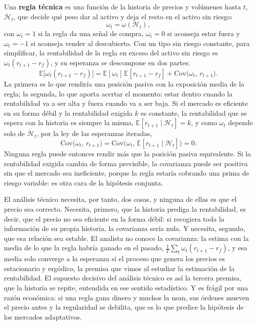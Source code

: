 \documentclass[10pt,a4paper]{article}
\begin{document}
Una \textbf{regla técnica} es una función de la historia de precios y volúmenes hasta $t$, $\mathcal H_t$, que decide qué peso dar al activo y deja el resto en el activo sin riesgo:
$$\omega_t=\omega(\mathcal H_t),$$
con $\omega_t=1$ si la regla da una señal de compra, $\omega_t=0$ si aconseja estar fuera y $\omega_t=-1$ si aconseja vender al descubierto. Con un tipo sin riesgo constante, para simplificar, la rentabilidad de la regla en exceso del activo sin riesgo es $\omega_t(r_{t+1}-r_f)$, y su esperanza se descompone en dos partes:
$$\mathbb E\big[\omega_t(r_{t+1}-r_f)\big]=\mathbb E[\omega_t]\,\mathbb E[r_{t+1}-r_f]+\mathrm{Cov}\big(\omega_t,\,r_{t+1}\big).$$
La primera es lo que rendiría una posición pasiva con la exposición media de la regla; la segunda, lo que aporta acertar el momento: estar dentro cuando la rentabilidad va a ser alta y fuera cuando va a ser baja. Si el mercado es eficiente en su forma débil y la rentabilidad exigida $k$ es constante, la rentabilidad que se espera con la historia es siempre la misma, $\mathbb E[r_{t+1}\mid \mathcal H_t]=k$, y como $\omega_t$ depende solo de $\mathcal H_t$, por la ley de las esperanzas iteradas,
$$\mathrm{Cov}\big(\omega_t,\,r_{t+1}\big)=\mathrm{Cov}\big(\omega_t,\,\mathbb E[r_{t+1}\mid \mathcal H_t]\big)=0.$$
Ninguna regla puede entonces rendir más que la posición pasiva equivalente. Si la rentabilidad exigida cambia de forma previsible, la covarianza puede ser positiva sin que el mercado sea ineficiente, porque la regla estaría cobrando una prima de riesgo variable: es otra cara de la hipótesis conjunta.

El análisis técnico necesita, por tanto, dos cosas, y ninguna de ellas es que el precio sea correcto. Necesita, primero, que la historia prediga la rentabilidad, es decir, que el precio no sea eficiente en la forma débil: si recogiera toda la información de su propia historia, la covarianza sería nula. Y necesita, segundo, que esa relación sea estable. El analista no conoce la covarianza: la estima con la media de lo que la regla habría ganado en el pasado, $\frac1T\sum_t\omega_t(r_{t+1}-r_f)$, y esa media solo converge a la esperanza si el proceso que genera los precios es estacionario y ergódico, la premisa que vimos al estudiar la estimación de la rentabilidad. El supuesto decisivo del análisis técnico es así la tercera premisa, que la historia se repite, entendida en ese sentido estadístico. Y es frágil por una razón económica: si una regla gana dinero y muchos la usan, sus órdenes mueven el precio antes y la regularidad se debilita, que es lo que predice la hipótesis de los mercados adaptativos.
\end{document}
